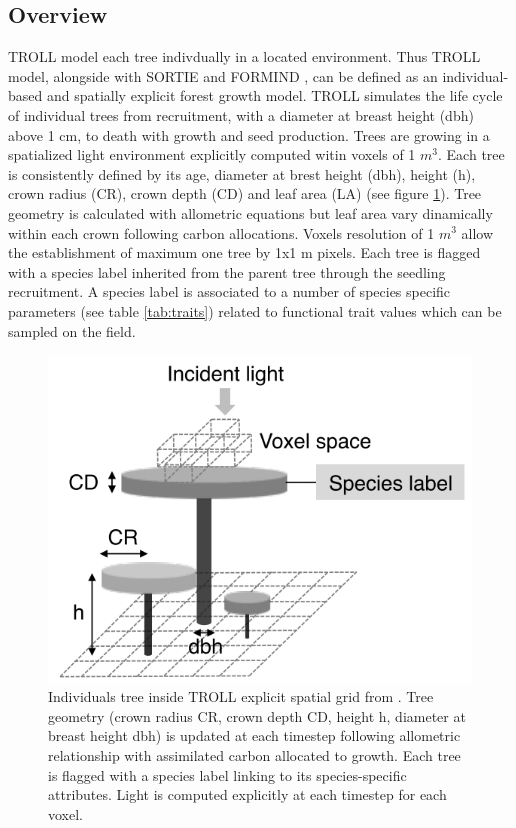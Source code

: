 \documentclass[12pt,]{article}
\theoremstyle{definition}
\theoremstyle{definition}
\theoremstyle{remark}
\begin{document}
\subsection{Overview}\label{overview}

TROLL model each tree indivdually in a located environment. Thus TROLL
model, alongside with SORTIE \citep{Pacala1996, Uriarte2009} and FORMIND
\citep{Fischer2016, Kohler1998}, can be defined as an individual-based
and spatially explicit forest growth model. TROLL simulates the life
cycle of individual trees from recruitment, with a diameter at breast
height (dbh) above 1 cm, to death with growth and seed production. Trees
are growing in a spatialized light environment explicitly computed witin
voxels of 1 \(m^3\). Each tree is consistently defined by its age,
diameter at brest height (dbh), height (h), crown radius (CR), crown
depth (CD) and leaf area (LA) (see figure \ref{fig:TROLLtree}). Tree
geometry is calculated with allometric equations but leaf area vary
dinamically within each crown following carbon allocations. Voxels
resolution of 1 \(m^3\) allow the establishment of maximum one tree by
1x1 m pixels. Each tree is flagged with a species label inherited from
the parent tree through the seedling recruitment. A species label is
associated to a number of species specific parameters (see table
\ref{tab:traits}) related to functional trait values which can be
sampled on the field.

\begin{figure}[htbp]
\centering
\includegraphics{images/TROLLtree.png}
\caption{\label{fig:TROLLtree}Individuals tree inside TROLL explicit spatial
grid from \citet{Li}. Tree geometry (crown radius CR, crown depth CD,
height h, diameter at breast height dbh) is updated at each timestep
following allometric relationship with assimilated carbon allocated to
growth. Each tree is flagged with a species label linking to its
species-specific attributes. Light is computed explicitly at each
timestep for each voxel.}
\end{figure}
\end{document}

